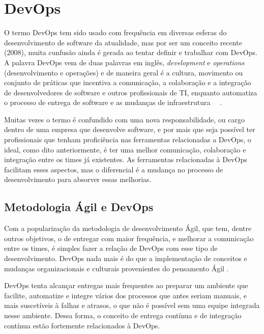\section{DevOps}
\label{sec:devops}

O termo DevOps tem sido usado com frequência em diversas esferas do
desenvolvimento de software da atualidade, mas por ser um conceito recente
(2008), muita cunfusão ainda é gerada ao tentar definir e trabalhar com DevOps.%
A palavra DevOps vem de duas palavras em inglês, \textit{development} e \textit{operations}
(desenvolvimento e operações) e de maneira geral é a cultura, movimento
ou conjunto de práticas que incentiva a comunicação, a colaboração e a integração de
desenvolvedores de software e outros profissionais de TI, enquanto automatiza o %
processo de entrega de software e as mudanças de infraestrutura 
~\cite{loukides2012devops}~\cite{erich2014mapping}.

Muitas vezes o termo é confundido com uma nova responsabilidade, ou cargo
dentro de uma empresa que desenvolve software, e por mais que seja possível
ter profissionais que tenham proficiência nas ferramentas relacionadas a
DevOps, o ideal, como dito anteriormente, é ter uma melhor comunicação,
colaboração e integração entre os times já existentes. As ferramentas
relacionadas à DevOps facilitam esses aspectos, mas o diferencial é a
mudança no processo de desenvolvimento para absorver essas melhorias. %


\subsection{Metodologia Ágil e DevOps}

Com a popularização da metodologia de desenvolvimento Ágil, que tem, dentre outros
objetivos, o de entregar com maior frequência, e melhorar a comunicação entre os
times, é simples fazer a relação de DevOps com esse tipo de desenvolvimento.
DevOps nada mais é do que a implementação de conceitos e mudanças organizacionais
e culturais provenientes do pensamento Ágil \cite{scott2014}.

DevOps tenta alcançar entregas mais frequentes ao preparar um ambiente que facilite,
automatize e integre vários dos processos que antes seriam manuais, e mais
suscetíveis à falhas e atrasos, o que não é possível sem uma equipe integrada
nesse ambiente. Dessa forma, o conceito de entrega contínua e de integração
contínua estão fortemente relacionados à DevOps. %

